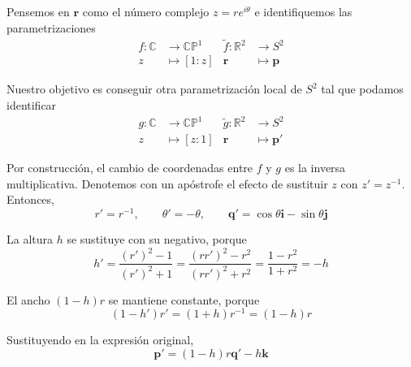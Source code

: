 \begin{solution}
Pensemos en $\mathbf r$ como el número complejo $z = re^{i\theta}$ e identifiquemos las parametrizaciones
\begin{align*}
    f : \mathbb C & \longrightarrow \mathbb {CP}^1 & \tilde f : \mathbb R^2 & \longrightarrow S^2 \\
                z & \longmapsto     [1:z]          &            \mathbf r   & \longmapsto     \mathbf p
\end{align*}

Nuestro objetivo es conseguir otra parametrización local de $S^2$ tal que podamos identificar
\begin{align*}
    g : \mathbb C & \longrightarrow \mathbb{CP}^1 & \tilde g : \mathbb R^2 & \longrightarrow S^2 \\
                z & \longmapsto     [z:1]         &            \mathbf r   & \longmapsto     \mathbf p'
\end{align*}

Por construcción, el cambio de coordenadas entre $f$ y $g$ es la inversa multiplicativa. Denotemos con un apóstrofe el efecto de sustituir $z$ con $z' = z^{-1}$. Entonces,
$$r' = r^{-1}, \qquad \theta' = -\theta, \qquad \mathbf q' = \cos \theta \mathbf i - \sin \theta \mathbf j$$

La altura $h$ se sustituye con su negativo, porque
$$h' = \frac {(r')^2 - 1} {(r')^2 + 1} = \frac {(rr')^2 - r^2} {(rr')^2 + r^2} = \frac {1 - r^2} {1 + r^2} = -h$$

El ancho $(1-h)r$ se mantiene constante, porque
$$(1-h')r' = (1+h)r^{-1} = (1-h)r$$

Sustituyendo en la expresión original,
$$\mathbf p' = (1-h)r \mathbf q' - h \mathbf k$$
\end{solution}
